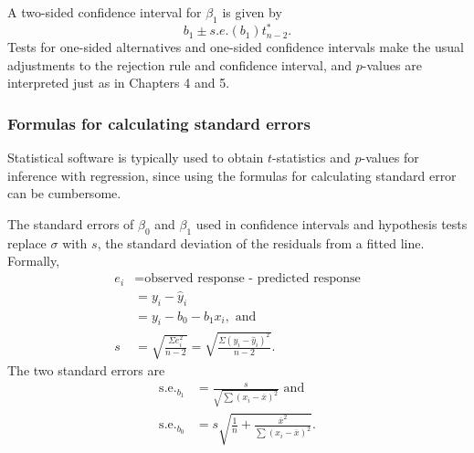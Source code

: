 A two-sided confidence interval for $\beta_1$ is given by 
\[b_1 \pm s.e.(b_1)t^*_{n-2}.\]
Tests for one-sided alternatives and one-sided confidence intervals make the usual adjustments to the rejection rule and confidence interval, and $p$-values are interpreted just as in Chapters 4 and 5.

\subsubsection{Formulas for calculating standard errors}

Statistical software is typically used to obtain $t$-statistics and $p$-values for inference with regression, since using the formulas for calculating standard error can be cumbersome.

The standard errors of $\beta_0$ and $\beta_1$ used in confidence intervals and hypothesis tests replace $\sigma$ with $s$, the standard deviation of the residuals from a fitted line. Formally, 
\begin{align*}
e_{i} &= \textrm{observed response - predicted response}\\
&= y_{i}-\hat{y}_{i}\\
&= y_{i}-b_{0}-b_{1}x_{i}, \text{   and} \\
s &= \sqrt{\frac{\Sigma e^{2}_{i}}{n-2}} =  \sqrt{\frac{\Sigma (y_{i}-\hat{y}_{i})^{2}}{n-2}}.
\end{align*}
The two standard errors are
\begin{align*}
\text{s.e.}_{b_1} &= \frac{s}{\sqrt{\sum(x_i -\overline{x})^2}} \text{   and}\\
\text{s.e.}_{b_0} &= s \sqrt{\frac{1}{n} + \frac{\overline{x}^2}
	{\sum(x_i - \overline{x})^2}}.
\end{align*}

